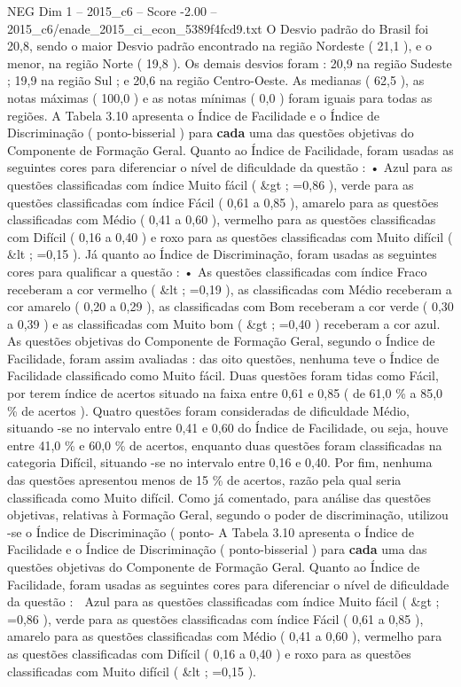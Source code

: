 \begin{textsample}{NEG Dim 1 – 2015\_c6 – Score -2.00 – 2015\_c6/enade\_2015\_ci\_econ\_5389f4fcd9.txt}
O Desvio padrão do Brasil foi 20,8, sendo o maior Desvio padrão encontrado na região Nordeste ( 21,1 ), e o menor, na região Norte ( 19,8 ).
Os demais desvios foram : 20,9 na região Sudeste ; 19,9 na região Sul ; e 20,6 na região Centro-Oeste.
As medianas ( 62,5 ), as notas máximas ( 100,0 ) e as notas mínimas ( 0,0 ) foram iguais para todas as regiões.
A Tabela 3.10 apresenta o Índice de Facilidade e o Índice de Discriminação ( ponto-bisserial ) para \textbf{cada} uma das questões objetivas do Componente de Formação Geral.
Quanto ao Índice de Facilidade, foram usadas as seguintes cores para diferenciar o nível de dificuldade da questão : • Azul para as questões classificadas com índice Muito fácil ( \&gt ; =0,86 ), verde para as questões classificadas com índice Fácil ( 0,61 a 0,85 ), amarelo para as questões classificadas com Médio ( 0,41 a 0,60 ), vermelho para as questões classificadas com Difícil ( 0,16 a 0,40 ) e roxo para as questões classificadas com Muito difícil ( \&lt ; =0,15 ).
Já quanto ao Índice de Discriminação, foram usadas as seguintes cores para qualificar a questão : • As questões classificadas com índice Fraco receberam a cor vermelho ( \&lt ; =0,19 ), as classificadas com Médio receberam a cor amarelo ( 0,20 a 0,29 ), as classificadas com Bom receberam a cor verde ( 0,30 a 0,39 ) e as classificadas com Muito bom ( \&gt ; =0,40 ) receberam a cor azul.
As questões objetivas do Componente de Formação Geral, segundo o Índice de Facilidade, foram assim avaliadas : das oito questões, nenhuma teve o Índice de Facilidade classificado como Muito fácil.
Duas questões foram tidas como Fácil, por terem índice de acertos situado na faixa entre 0,61 e 0,85 ( de 61,0 \% a 85,0 \% de acertos ).
Quatro questões foram consideradas de dificuldade Médio, situando -se no intervalo entre 0,41 e 0,60 do Índice de Facilidade, ou seja, houve entre 41,0 \% e 60,0 \% de acertos, enquanto duas questões foram classificadas na categoria Difícil, situando -se no intervalo entre 0,16 e 0,40.
Por fim, nenhuma das questões apresentou menos de 15 \% de acertos, razão pela qual seria classificada como Muito difícil.
Como já comentado, para análise das questões objetivas, relativas à Formação Geral, segundo o poder de discriminação, utilizou -se o Índice de Discriminação ( ponto- A Tabela 3.10 apresenta o Índice de Facilidade e o Índice de Discriminação ( ponto-bisserial ) para \textbf{cada} uma das questões objetivas do Componente de Formação Geral.
Quanto ao Índice de Facilidade, foram usadas as seguintes cores para diferenciar o nível de dificuldade da questão :  Azul para as questões classificadas com índice Muito fácil ( \&gt ; =0,86 ), verde para as questões classificadas com índice Fácil ( 0,61 a 0,85 ), amarelo para as questões classificadas com Médio ( 0,41 a 0,60 ), vermelho para as questões classificadas com Difícil ( 0,16 a 0,40 ) e roxo para as questões classificadas com Muito difícil ( \&lt ; =0,15 ).

\end{textsample}
